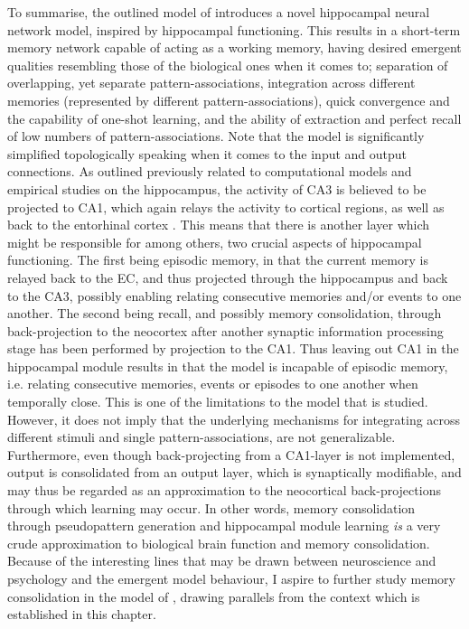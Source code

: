 
To summarise, the outlined model of \cite{Hattori2014} introduces a novel hippocampal neural network model, inspired by hippocampal functioning. This results in a short-term memory network capable of acting as a working memory, having desired emergent qualities resembling those of the biological ones when it comes to; separation of overlapping, yet separate pattern-associations, integration across different memories (represented by different pattern-associations), quick convergence and the capability of one-shot learning, and the ability of extraction and perfect recall of low numbers of pattern-associations.
Note that the model is significantly simplified topologically speaking when it comes to the input and output connections. As outlined previously related to computational models and empirical studies on the hippocampus, the activity of CA3 is believed to be projected to CA1, which again relays the activity to cortical regions, as well as back to the entorhinal cortex \citep{Rolls1998chpt6}. This means that there is another layer which might be responsible for among others, two crucial aspects of hippocampal functioning. The first being episodic memory, in that the current memory is relayed back to the EC, and thus projected through the hippocampus and back to the CA3, possibly enabling relating consecutive memories and/or events to one another. The second being recall, and possibly memory consolidation, through back-projection to the neocortex after another synaptic information processing stage has been performed by projection to the CA1.
Thus leaving out CA1 in the hippocampal module results in that the model is incapable of episodic memory, i.e. relating consecutive memories, events or episodes to one another when temporally close. This is one of the limitations to the model that is studied. However, it does not imply that the underlying mechanisms for integrating across different stimuli and single pattern-associations, are not generalizable. Furthermore, even though back-projecting from a CA1-layer is not implemented, output is consolidated from an output layer, which is synaptically modifiable, and may thus be regarded as an approximation to the neocortical back-projections through which learning may occur. In other words, memory consolidation through pseudopattern generation and hippocampal module learning \textit{is} a very crude approximation to biological brain function and memory consolidation. Because of the interesting lines that may be drawn between neuroscience and psychology and the emergent model behaviour, I aspire to further study memory consolidation in the model of \cite{Hattori2014}, drawing parallels from the context which is established in this chapter.

